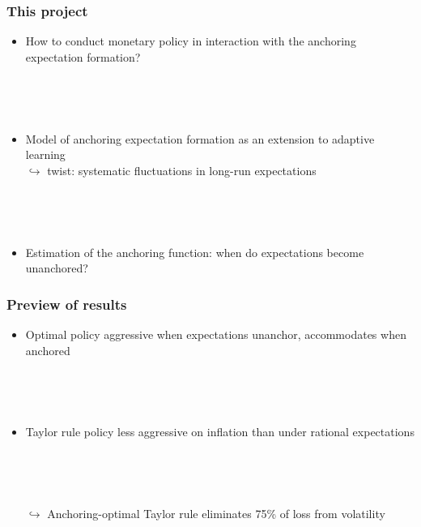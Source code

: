 \documentclass[10pt]{beamer}
\def\ppFEunanchors{1 }
\def\movei{5 }
\begin{document}
\begin{frame}
	\frametitle{This project}
	
	\begin{itemize}
	\item How to conduct monetary policy in interaction with the anchoring expectation formation?
	
	\
	
	\

	\item Model of anchoring expectation formation as an extension to adaptive learning \\
	$\hookrightarrow$ twist: systematic fluctuations in long-run expectations
	
	
	\
	
	\
	
	\item Estimation of the anchoring function: when do expectations become unanchored?

	\end{itemize}
	\end{frame}
\begin{frame}
	\frametitle{Preview of results}
	
	\vspace{0.5cm}
	
	\begin{itemize}
%
%	
%	
%	
	
%	
%	
%	
%	
%	
	\item Optimal policy aggressive when expectations unanchor, accommodates when anchored
	
	\
	
	\
	

	\item Taylor rule policy less aggressive on inflation than under rational expectations
	
	\
	
	\
	
	\item[$\hookrightarrow$] Anchoring-optimal Taylor rule eliminates 75\% of loss from volatility


	\end{itemize}


\end{frame}
\end{document}
